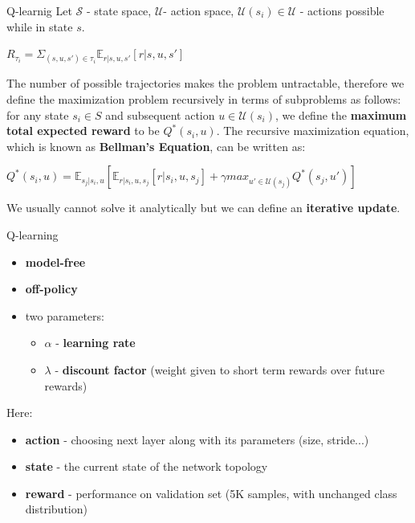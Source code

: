 \documentclass[15pt]{beamer}
\begin{document}
\begin{frame}{Q-learnig}
  Let $\mathcal{S}$ - state space, $\mathcal{U}$- action space, $\mathcal{U}(s_i) \in \mathcal{U}$ - actions possible while in state $s$.

  \begin{center}
  $R_{\tau_i} = \Sigma_{(s, u, s') \in \tau_i} \mathds{E}_{r|s, u, s'}[r|s, u, s']$
  \end{center}

  The number of possible trajectories makes the problem untractable, therefore we define the maximization problem recursively in terms of subproblems as follows: for any state $s_i \in S$ and subsequent action $u \in \mathcal{U}(s_i)$, we define the \textbf{maximum total expected reward} to be $Q^*(s_i, u)$. The recursive maximization equation, which is known as \textbf{Bellman's Equation}, can be written as:

  \begin{center}
  $Q^*(s_i, u) = \mathds{E}_{s_j|s_i, u}[ \mathds{E}_{r|s_i, u, s_j}[r|s_i, u, s_j] + \gamma max_{u' \in \mathcal{U}(s_j)} Q^*(s_j, u') ]$ 
  \end{center}

  We usually cannot solve it analytically but we can define an \textbf{iterative update}.
\end{frame}


\begin{frame}{Q-learning}
  \begin{itemize}
  \item \textbf{model-free}
  \item \textbf{off-policy}
  \item two parameters:
  \begin{itemize}
  \item $\alpha$ - \textbf{learning rate}
  \item $\lambda$ - \textbf{discount factor} (weight given to short term rewards over future rewards)
  \end{itemize}
  \end{itemize}
  
  Here:
  \begin{itemize}
  \item \textbf{action} - choosing next layer along with its parameters (size, stride...)
  \item \textbf{state} - the current state of the network topology
  \item \textbf{reward} - performance on validation set (5K samples, with unchanged class distribution)
  \end{itemize}
\end{frame}
\end{document}
